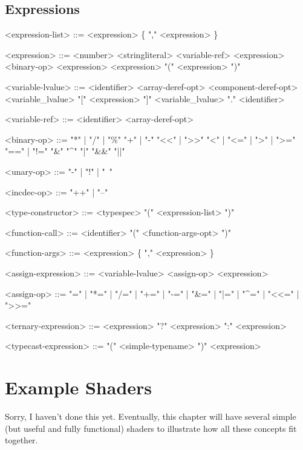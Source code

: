 \documentclass[11pt,letterpaper]{book}
\begin{document}
\section*{Expressions}
\begin{grammar}

<expression-list> ::= <expression> \{ "," <expression> \}

<expression> ::= <number>
\alt <stringliteral>
 <variable-ref>
\alt <expression> <binary-op> <expression>
 <expression>
\alt "(" <expression> ")"

<variable-lvalue> ::= <identifier> <array-deref-opt> <component-deref-opt>
\alt <variable_lvalue> "[" <expression> "]"
\alt <variable_lvalue> "." <identifier>

<variable-ref> ::= <identifier> <array-deref-opt> 

<binary-op> ::= "*" | "/" | "\%"
\alt "+" | "-" 
\alt "<<" | ">>"
\alt "<" | "<=" | ">" | ">=" 
\alt "==" | "!=" 
\alt "&"
\alt "^"
\alt "|"
\alt "&&" 
\alt "||" 

<unary-op> ::= "-" | "!" | "~"

<incdec-op> ::= "++" | "--"

<type-constructor> ::= <typespec> "(" <expression-list> ")"

<function-call> ::= <identifier> "(" <function-args-opt> ")"

<function-args> ::= <expression> \{ "," <expression> \}

<assign-expression> ::= <variable-lvalue> <assign-op> <expression>

<assign-op> ::= "=" | "*=" | "/=" | "+=" | "-=" | "&=" | "|=" | "^=" |
"<<=" | ">>="

<ternary-expression> ::= <expression> "?" <expression> ":" <expression>

<typecast-expression> ::= "(" <simple-typename> ")" <expression>

\end{grammar}


\chapter{Example Shaders}
\label{chap:exampleshaders}

\begin{annotate}
Sorry, I haven't done this yet.  Eventually, this chapter will have
several simple (but useful and fully functional) shaders to illustrate
how all these concepts fit together.
\end{annotate}
\end{document}
